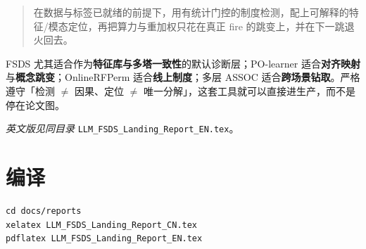 \documentclass[11pt,a4paper,UTF8,fontset=none]{ctexart}
\begin{document}
\begin{quote}
在数据与标签已就绪的前提下，用有统计门控的制度检测，配上可解释的特征/模态定位，再把算力与重加权只花在真正 fire 的跳变上，并在下一跳退火回去。
\end{quote}

FSDS 尤其适合作为\textbf{特征库与多塔一致性}的默认诊断层；PO-learner 适合\textbf{对齐映射}与\textbf{概念跳变}；OnlineRFPerm 适合\textbf{线上制度}；多层 ASSOC 适合\textbf{跨场景钻取}。严格遵守「检测 \(\neq\) 因果、定位 \(\neq\) 唯一分解」，这套工具就可以直接进生产，而不是停在论文图。

\vspace{1em}
\noindent\textit{英文版见同目录} \texttt{LLM\_FSDS\_Landing\_Report\_EN.tex}。

\section*{编译}
\begin{verbatim}
cd docs/reports
xelatex LLM_FSDS_Landing_Report_CN.tex
pdflatex LLM_FSDS_Landing_Report_EN.tex
\end{verbatim}
\end{document}
